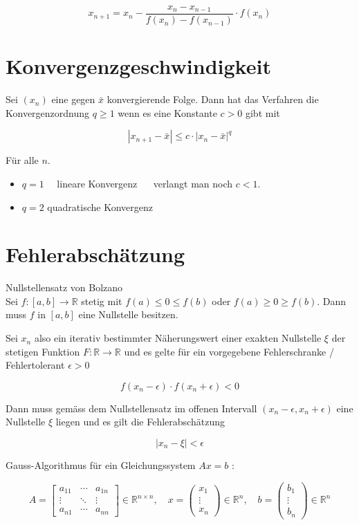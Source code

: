\documentclass[10pt]{article}
\begin{document}
$$
x_{n+1}=x_{n}-\frac{x_{n}-x_{n-1}}{f\left(x_{n}\right)-f\left(x_{n-1}\right)} \cdot f\left(x_{n}\right)
$$

\section*{Konvergenzgeschwindigkeit}
Sei $\left(x_{n}\right)$ eine gegen $\bar{x}$ konvergierende Folge. Dann hat das Verfahren die Konvergenzordnung $q \geq 1$ wenn es eine Konstante $c>0$ gibt mit

$$
\left|x_{n+1}-\bar{x}\right| \leq c \cdot\left|x_{n}-\bar{x}\right|^{q}
$$

Für alle $n$.

\begin{itemize}
  \item $q=1 \quad$ lineare Konvergenz $\quad$ verlangt man noch $c<1$.
  \item $q=2$ quadratische Konvergenz
\end{itemize}

\section*{Fehlerabschätzung}
Nullstellensatz von Bolzano\\
Sei $f:[a, b] \rightarrow \mathbb{R}$ stetig mit $f(a) \leq 0 \leq f(b)$ oder $f(a) \geq 0 \geq f(b)$. Dann muss $f$ in $[a, b]$ eine Nullstelle besitzen.

Sei $x_{n}$ also ein iterativ bestimmter Näherungswert einer exakten Nullstelle $\xi$ der stetigen Funktion $F: \mathbb{R} \rightarrow \mathbb{R}$ und es gelte für ein vorgegebene Fehlerschranke / Fehlertolerant $\epsilon>0$

$$
f\left(x_{n}-\epsilon\right) \cdot f\left(x_{n}+\epsilon\right)<0
$$

Dann muss gemäss dem Nullstellensatz im offenen Intervall $\left(x_{n}-\epsilon, x_{n}+\epsilon\right)$ eine Nullstelle $\xi$ liegen und es gilt die Fehlerabschätzung

$$
\left|x_{n}-\xi\right|<\epsilon
$$

Gauss-Algorithmus für ein Gleichungssystem $A x=b$ :

$$
A=\left[\begin{array}{ccc}
a_{11} & \cdots & a_{1 n} \\
\vdots & \ddots & \vdots \\
a_{n 1} & \cdots & a_{n n}
\end{array}\right] \in \mathbb{R}^{n \times n}, \quad x=\left(\begin{array}{c}
x_{1} \\
\vdots \\
x_{n}
\end{array}\right) \in \mathbb{R}^{n}, \quad b=\left(\begin{array}{c}
b_{1} \\
\vdots \\
b_{n}
\end{array}\right) \in \mathbb{R}^{n}
$$
\end{document}
